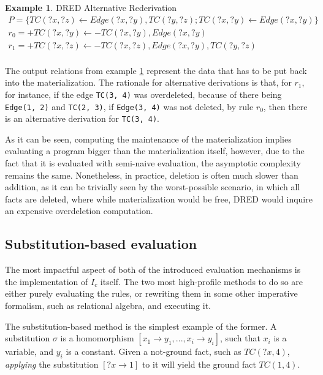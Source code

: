 \documentclass[sigconf,screen,review,natbib]{acmart}
\theoremstyle{definition}
\newtheorem{exmp}{Example}[section]
\begin{document}
\begin{exmp}{DRED Alternative Rederivation}
	\tiny
	\begin{align}
		P = \{ TC(?x, ?z) \leftarrow Edge(?x, ?y), TC(?y, ?z); TC(?x, ?y) \leftarrow Edge(?x, ?y) \} \nonumber                                                           \\
		r_0 = +TC(?x, ?y) \leftarrow -TC(?x, ?y), Edge(?x, ?y)                                                                                                           \\
		r_1 = +TC(?x, ?z) \leftarrow -TC(?x, ?z), Edge(?x, ?y), TC(?y, ?z)                                                                                     \nonumber \\
	\end{align}
	\label{ex7}
\end{exmp}

The output relations from example \ref{ex7} represent the data that has to be put back into the materialization.
The rationale for alternative derivations is that, for $r_1$, for instance, if the edge \verb|TC(3, 4)| was
overdeleted, because of there being \verb|Edge(1, 2)| and \verb|TC(2, 3)|, if \verb|Edge(3, 4)| was not deleted, by
rule $r_0$, then there is an alternative derivation for \verb|TC(3, 4)|.

As it can be seen, computing the maintenance of the materialization implies evaluating a program bigger than the
materialization itself, however, due to the fact that it is evaluated with semi-naive evaluation, the asymptotic
complexity remains the same\cite{complexity_of_dred}. Nonetheless, in practice, deletion is often much slower than
addition, as it can be trivially seen by the worst-possible scenario, in which all facts are deleted, where while
materialization would be free, DRED would inquire an expensive overdeletion computation.

\subsection{Substitution-based evaluation}
The most impactful aspect of both of the introduced evaluation mechanisms is the implementation
of $I_c$ itself. The two most high-profile methods to do so are either purely evaluating the rules, or
rewriting them in some other imperative formalism, such as relational algebra, and executing it.

The substitution-based\cite{datalog} method is the simplest example of the former. A substitution $\sigma$ is
a homomorphism $[x_1 \rightarrow y_1, ..., x_i \rightarrow y_i]$, such that $x_i$ is a variable, and $y_i$ is
a constant. Given a not-ground fact, such as $TC(?x, 4)$, \textit{applying} the substitution $[?x \rightarrow 1]$ to
it will yield the ground fact $TC(1, 4)$.
\end{document}
